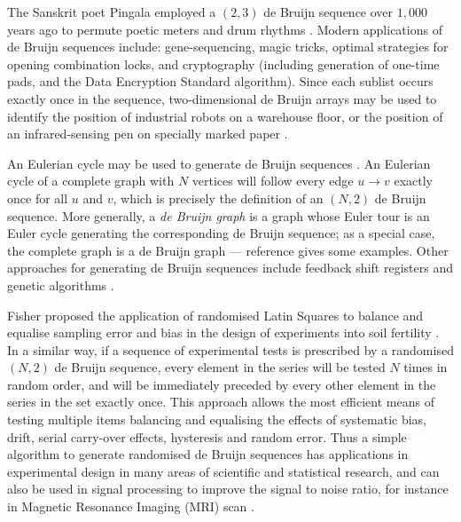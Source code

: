 \documentclass[12pt]{article}
\begin{document}
The Sanskrit poet Pingala employed a $(2,3)$ de Bruijn sequence over $1,000$ years ago to permute poetic meters and drum rhythms \cite{hall,knuth4a}. Modern applications of de Bruijn sequences include: gene-sequencing, magic tricks, optimal strategies for opening combination locks, and cryptography (including generation of one-time pads, and the Data Encryption Standard algorithm). Since each sublist occurs exactly once in the sequence, two-dimensional de Bruijn arrays may be used to identify the position of industrial robots on a warehouse floor, or the position of an infrared-sensing pen on specially marked paper \cite{diaconis}.

An Eulerian cycle may be used to generate de Bruijn sequences \cite{fleury,hierholzer}. An Eulerian cycle of a complete graph with $N$ vertices will follow every edge $u \rightarrow v$ exactly once for all $u$ and $v$, which is precisely the definition of an $(N,2)$ de Bruijn sequence. More generally, a \emph{de Bruijn graph\/} is a graph whose Euler tour is an Euler cycle generating the corresponding de Bruijn sequence; as a special case, the complete graph is a de Bruijn graph --- reference \cite{good} gives some examples. Other approaches for generating de Bruijn sequences include feedback shift registers and genetic algorithms \cite{turan,knuth4a}.%

Fisher proposed the application of randomised Latin Squares to balance and equalise sampling error and bias in the design of experiments into soil fertility \cite{fisher}. 
In a similar way, if a sequence of experimental tests is prescribed by a randomised $(N,2)$ de Bruijn sequence, every element in the series will be tested $N$ times in random order, and will be immediately preceded by every other element in the series in the set exactly once. This approach allows the most efficient means of testing multiple items balancing and equalising the effects of systematic bias, drift, serial carry-over effects, hysteresis and random error. Thus a simple algorithm to generate randomised de Bruijn sequences has applications in experimental design in many areas of scientific and statistical research,  and can also be used in signal processing to improve the signal to noise ratio, for instance in Magnetic Resonance Imaging (MRI) scan \cite{aguirre}.
\end{document}
